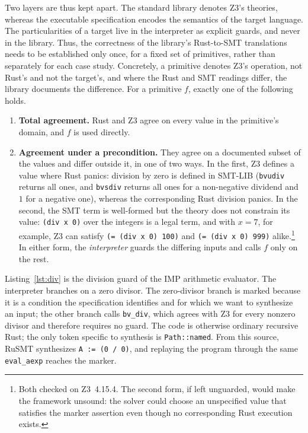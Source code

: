 \documentclass[sigconf,screen]{acmart}
\theoremstyle{definition}
\theoremstyle{remark}
\newcommand{\rusmt}{RuSMT}
\newcommand{\imp}{IMP}
\newcommand{\code}[1]{\texttt{#1}}
\begin{document}
Two layers are thus kept apart. The standard library denotes Z3's theories, whereas the executable specification encodes the semantics of the target
language. The particularities of a target live in the interpreter as
explicit guards, and never in the library. Thus, the correctness of the library's Rust-to-SMT translations needs to be established only once, for a fixed set of primitives, rather than separately for each case study. Concretely, a primitive denotes Z3's
operation, not Rust's and not the target's, and where the Rust and SMT readings differ,
the library documents the difference. For a primitive $f$,
exactly one of the following holds.
\begin{enumerate}[leftmargin=1.4em,itemsep=1pt,topsep=2pt]
\item \textbf{Total agreement.} Rust and Z3 agree on every value in the primitive's domain,
and $f$ is used directly.
\item \textbf{Agreement under a precondition.} They agree on a documented subset of the values and differ outside it, in one of two ways. In the first, Z3 defines a value where Rust panics: division by zero is
defined in SMT-LIB (\code{bvudiv} returns all ones, and \code{bvsdiv} returns
all ones for a non-negative dividend and $1$ for a negative one), whereas the
corresponding Rust division panics. In the second, the SMT term is well-formed
but the theory does not constrain its value: \code{(div x 0)} over the integers is a
legal term, and with $x = 7$, for example, Z3 can satisfy \code{(= (div x 0) 100)} and
\code{(= (div x 0) 999)} alike.\footnote{Both checked on Z3~4.15.4. The second form, if left unguarded, would make the framework unsound: the solver could choose an unspecified value that satisfies the marker assertion even though no corresponding Rust execution exists.} In either form, the
\emph{interpreter} guards the differing inputs and calls $f$ only on the rest.
\end{enumerate}
Listing~\ref{lst:div} is the division guard of the \imp{} arithmetic evaluator.
The interpreter branches on a zero divisor. The zero-divisor branch is marked because it is a condition the specification identifies and for which we want to synthesize an input; the other branch calls \code{bv\_div}, which agrees with Z3 for every nonzero divisor and therefore requires no guard. The code is otherwise ordinary recursive Rust; the only token specific to synthesis is \code{Path::named}. From this source, \rusmt{} synthesizes \code{A := (0 / 0)}, and replaying the program through the same \code{eval\_aexp} reaches the marker.
\end{document}
